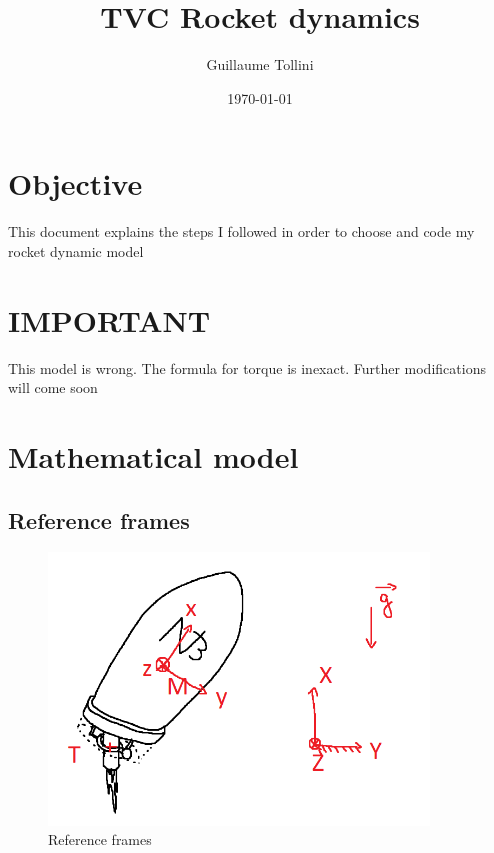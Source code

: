 \documentclass[a4paper, 12 pt]{article}
\author{Guillaume Tollini}
\title{TVC Rocket dynamics}
\date{\vfill \today}
\begin{document}
\maketitle

\newpage

\section*{Objective}
This document explains the steps I followed in order to choose and code my rocket dynamic model

\newpage

\section*{IMPORTANT}
This model is wrong. The formula for torque is inexact. Further modifications will come soon


\newpage

\tableofcontents

\newpage


\section{Mathematical model}
\subsection{Reference frames}
\begin{figure}[!h]
\hspace{0 cm}
\includegraphics[width=0.9\textwidth]{schema-fusee.png}
\caption{Reference frames}
\end{figure}
\end{document}
